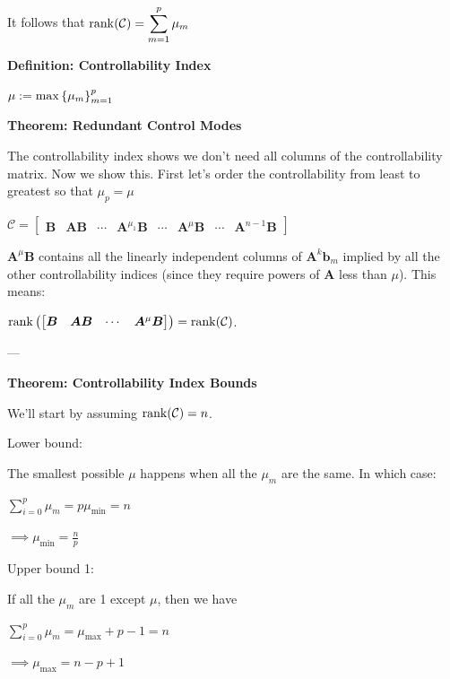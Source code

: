 \documentclass[11pt]{article}
\begin{document}
  It follows that \(\rank(\mathcal{C}) = \displaystyle \sum_{m = 1}^p \mu_m\)

  \textbf{Definition: Controllability Index}

  \(\mu := \displaystyle \max {\left\{ \mu_m \right\}}_{m = 1}^p\)

  \pagebreak

  \textbf{Theorem: Redundant Control Modes}

  The controllability index shows we don't need all columns of the controllability matrix. Now we show this.
  First let's order the controllability from least to greatest so that \(\mu_p = \mu\)

  \(\mathcal{C} =
  \begin{bmatrix}
    \bm{B} &
    \bm{AB} & \cdots &
    \bm{A}^{\mu_1}\bm{B} & \cdots &
    \bm{A}^{\mu}\bm{B} & \cdots &
    \bm{A}^{n - 1}\bm{B}
  \end{bmatrix}\)

  \(\bm{A}^{\mu}\bm{B}\) contains all the linearly independent columns of \(\bm{A}^k\bm{b}_m\) implied by
  all the other controllability indices (since they require powers of \(\bm{A}\) less than \(\mu\)). This means:

  \(\rank{\left( \begin{bmatrix} \bm{B} & \bm{AB} & \cdots & \bm{A}^\mu\bm{B}\end{bmatrix} \right)} = \rank(\mathcal{C})\).

  ---

  \textbf{Theorem: Controllability Index Bounds}

  We'll start by assuming \(\rank(\mathcal{C}) = n\).

  \vspace{12pt}

  Lower bound:

  The smallest possible \(\mu\) happens when all the \(\mu_m\) are the same. In which case:

  \(\displaystyle \sum_{i = 0}^p \mu_m = p\mu_{\textrm{min}} = n\)

  \(\implies \mu_{\textrm{min}} = \frac{n}{p}\)

  \vspace{12pt}

  Upper bound 1:

  If all the \(\mu_m\) are 1 except \(\mu\), then we have

  \(\displaystyle \sum_{i = 0}^p \mu_m = \mu_{\textrm{max}} + p - 1 = n\)

  \(\implies \mu_{\textrm{max}} = n - p + 1\)
\end{document}
